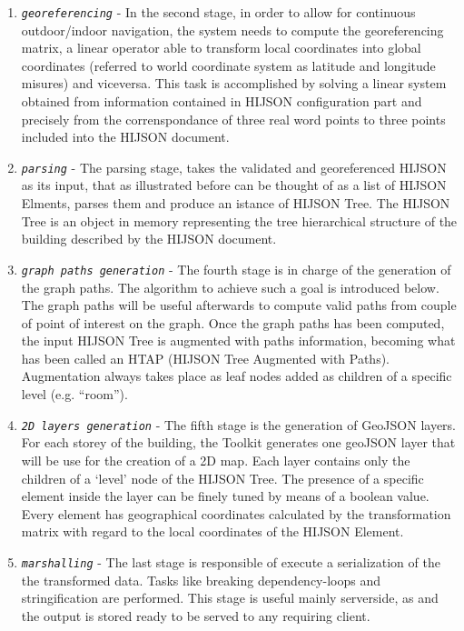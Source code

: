\begin{enumerate}
\item
 \textit{\texttt{georeferencing}} - In the second stage, in order to allow
 for continuous outdoor/indoor navigation, the system needs to compute
 the georeferencing matrix, a linear operator able to transform local
 coordinates into global coordinates (referred to world coordinate
 system as latitude and longitude misures) and viceversa. This task is
 accomplished by solving a linear system obtained from information
 contained in HIJSON configuration part and precisely from the
 correnspondance of three real word points to three points included
 into the HIJSON document.
\item
 \textit{\texttt{parsing}} - The parsing stage, takes the validated and
 georeferenced HIJSON as its input, that as illustrated before can be
 thought of as a list of HIJSON Elments, parses them and produce an
 istance of HIJSON Tree. The HIJSON Tree is an object in memory
 representing the tree hierarchical structure of the building described
 by the HIJSON document.
\item
 \textit{\texttt{graph paths generation}} - The fourth stage is in charge
 of the generation of the graph paths. The algorithm to achieve such a 
 goal is introduced below. The graph paths will be
 useful afterwards to compute valid paths from couple of point of
 interest on the graph. Once the graph paths has been computed, the
 input HIJSON Tree is augmented with paths information, becoming what
 has been called an HTAP (HIJSON Tree Augmented with Paths).
 Augmentation always takes place as leaf nodes added as children of a
 specific level (e.g. ``room'').
\item
 \textit{\texttt{2D layers generation}} - The fifth stage is the
 generation of GeoJSON layers. For each storey of the building, the Toolkit generates one
 geoJSON layer that will be use for the creation of a 2D map. Each layer
 contains only the children of a `level' node of the HIJSON Tree. 
 The presence of a specific element inside the layer can be finely tuned 
 by means of a boolean value. Every element has geographical coordinates
 calculated by the transformation matrix with regard to the local
 coordinates of the HIJSON Element.
\item
 \textit{\texttt{marshalling}} - The last stage is responsible of execute
 a serialization of the the transformed data. Tasks like breaking
 dependency-loops and stringification are performed. This stage is
 useful mainly serverside, as and the output is stored ready to be
 served to any requiring client.
\end{enumerate}

